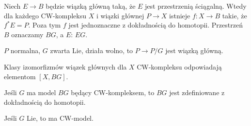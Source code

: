  \begin{twierdzenie}
  Niech $E \to B$ będzie wiązką główną taką, że $E$ jest przestrzenią ściągalną. Wtedy dla każdego CW-kompleksu $X$ i wiązki głównej $P\to X$ istnieje $f:X \to B$ takie, że $f^\ast E = P$. Poza tym $f$ jest jednoznaczne z dokładnością do homotopii. Przestrzeń $B$ oznaczamy $BG$, a $E$: $EG$.
 \end{twierdzenie}
 
 \begin{uwaga}
  $P$ normalna, $G$ zwarta Lie, działa wolno, to $P\to P/G$ jest wiązką główną.
 \end{uwaga}
 
 \begin{wniosek}
  Klasy izomorfizmów wiązek głównych dla $X$ CW-kompleksu odpowiadają elementom $[X, BG]$.
 \end{wniosek}
 
 \begin{wniosek}
  Jeśli $G$ ma model $BG$ będący CW-kompleksem, to $BG$ jest zdefiniowane z dokładnością do homotopii.
 \end{wniosek}
 
 \begin{uwaga}
  Jeśli $G$ Lie, to ma CW-model.
 \end{uwaga}













 
